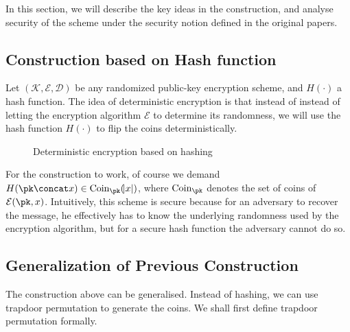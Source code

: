 \documentclass[10pt]{book}
\begin{document}
In this section, we will describe the key ideas in the construction, and analyse security of the scheme under the security notion defined in the original papers.


\subsection{Construction based on Hash function}
Let $(\mathcal{K}, \mathcal{E}, \mathcal{D})$ be any randomized public-key encryption scheme, and $H(\cdot)$ a hash function. The idea of deterministic encryption is that instead of instead of letting the encryption algorithm $\mathcal{E}$ to determine its randomness, we will use the hash function $H(\cdot)$ to flip the coins deterministically.

\begin{figure}
\begin{pchstack}[center]
	
	\pchspace
	
	
	\pchspace
	
\end{pchstack}

\caption{Deterministic encryption based on hashing}
\end{figure}


For the construction to work, of course we demand $H(\pk \concat x) \in \text{Coin}_{\pk}(\abs{x})$, where $\text{Coin}_{\pk}$ denotes the set of coins of $\mathcal{E}(\pk, x)$. Intuitively, this scheme is secure because for an adversary to recover the message, he effectively has to know the underlying randomness used by the encryption algorithm, but for a secure hash function the adversary cannot do so.


\subsection{Generalization of Previous Construction}
The construction above can be generalised. Instead of hashing, we can use trapdoor permutation to generate the coins. We shall first define trapdoor permutation formally.
\end{document}
